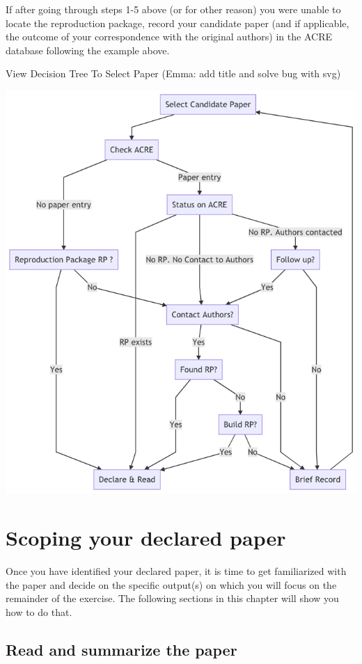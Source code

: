 \documentclass[]{book}
\begin{document}
If after going through steps 1-5 above (or for other reason) you were unable to locate the reproduction package, record your candidate paper (and if applicable, the outcome of your correspondence with the original authors) in the ACRE database following the example above.

View Decision Tree To Select Paper (Emma: add title and solve bug with svg)

\includegraphics{candidate-to-declared-paper.png}

\hypertarget{scoping-your-declared-paper}{%
\section{Scoping your declared paper}\label{scoping-your-declared-paper}}

Once you have identified your declared paper, it is time to get familiarized with the paper and decide on the specific output(s) on which you will focus on the remainder of the exercise. The following sections in this chapter will show you how to do that.

\hypertarget{read-sum}{%
\subsection{Read and summarize the paper}\label{read-sum}}
\end{document}
